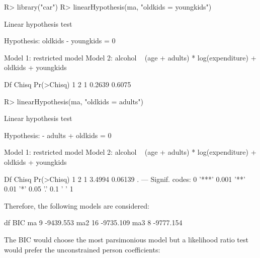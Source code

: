 \documentclass[nojss]{jss}
\begin{document}
\begin{Schunk}
\begin{Sinput}
R> library("car")
R> linearHypothesis(ma, "oldkids = youngkids")
\end{Sinput}
\begin{Soutput}
Linear hypothesis test

Hypothesis:
oldkids - youngkids = 0

Model 1: restricted model
Model 2: alcohol ~ (age + adults) * log(expenditure) + oldkids + youngkids

  Df  Chisq Pr(>Chisq)
1                     
2  1 0.2639     0.6075
\end{Soutput}
\begin{Sinput}
R> linearHypothesis(ma, "oldkids = adults")
\end{Sinput}
\begin{Soutput}
Linear hypothesis test

Hypothesis:
- adults  + oldkids = 0

Model 1: restricted model
Model 2: alcohol ~ (age + adults) * log(expenditure) + oldkids + youngkids

  Df  Chisq Pr(>Chisq)  
1                       
2  1 3.4994    0.06139 .
---
Signif. codes:  0 '***' 0.001 '**' 0.01 '*' 0.05 '.' 0.1 ' ' 1
\end{Soutput}
\end{Schunk}

Therefore, the following models are considered:

\begin{Schunk}
\begin{Soutput}
    df       BIC
ma   9 -9439.553
ma2 16 -9735.109
ma3  8 -9777.154
\end{Soutput}
\end{Schunk}

The BIC would choose the most parsimonious model but a likelihood ratio test would prefer
the unconstrained person coefficients:
\end{document}
